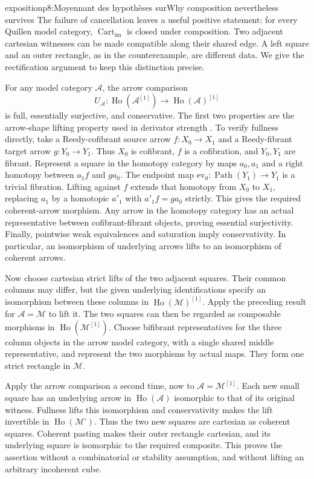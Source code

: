 \begin{dcomment}{exposition}{p8:Moyennant des hypothèses sur}{Why composition nevertheless survives}
The failure of cancellation leaves a useful positive statement: for every Quillen model category, $\operatorname{Cart}_{\mathrm{im}}$ is closed under composition. Two adjacent cartesian witnesses can be made compatible along their shared edge. A left square and an outer rectangle, as in the counterexample, are different data. We give the rectification argument to keep this distinction precise.

For any model category $\mathcal A$, the arrow comparison
\[
U_{\mathcal A}:\operatorname{Ho}(\mathcal A^{[1]})
 \longrightarrow\operatorname{Ho}(\mathcal A)^{[1]}
\]
is full, essentially surjective, and conservative. The first two properties are the arrow-shape lifting property used in derivator strength \citep[Lemma~1.9]{Groth2013}. To verify fullness directly, take a Reedy-cofibrant source arrow $f:X_0\to X_1$ and a Reedy-fibrant target arrow $g:Y_0\to Y_1$. Thus $X_0$ is cofibrant, $f$ is a cofibration, and $Y_0,Y_1$ are fibrant. Represent a square in the homotopy category by maps $a_0,a_1$ and a right homotopy between $a_1f$ and $ga_0$. The endpoint map $\mathrm{ev}_0:\operatorname{Path}(Y_1)\to Y_1$ is a trivial fibration. Lifting against $f$ extends that homotopy from $X_0$ to $X_1$, replacing $a_1$ by a homotopic $a'_1$ with $a'_1f=ga_0$ strictly. This gives the required coherent-arrow morphism. Any arrow in the homotopy category has an actual representative between cofibrant-fibrant objects, proving essential surjectivity. Finally, pointwise weak equivalences and saturation imply conservativity. In particular, an isomorphism of underlying arrows lifts to an isomorphism of coherent arrows.

Now choose cartesian strict lifts of the two adjacent squares. Their common columns may differ, but the given underlying identifications specify an isomorphism between these columns in $\operatorname{Ho}(\mathcal M)^{[1]}$. Apply the preceding result for $\mathcal A=\mathcal M$ to lift it. The two squares can then be regarded as composable morphisms in $\operatorname{Ho}(\mathcal M^{[1]})$. Choose bifibrant representatives for the three column objects in the arrow model category, with a single shared middle representative, and represent the two morphisms by actual maps. They form one strict rectangle in $\mathcal M$.

Apply the arrow comparison a second time, now to $\mathcal A=\mathcal M^{[1]}$. Each new small square has an underlying arrow in $\operatorname{Ho}(\mathcal A)$ isomorphic to that of its original witness. Fullness lifts this isomorphism and conservativity makes the lift invertible in $\operatorname{Ho}(\mathcal M^{\square})$. Thus the two new squares are cartesian as coherent squares. Coherent pasting makes their outer rectangle cartesian, and its underlying square is isomorphic to the required composite. This proves the assertion without a combinatorial or stability assumption, and without lifting an arbitrary incoherent cube.


\end{dcomment}
